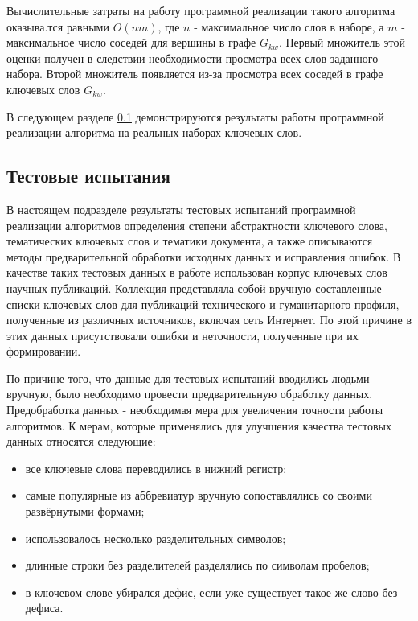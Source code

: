 Вычислительные затраты на работу программной реализации такого алгоритма оказыва.тся равными $O(nm)$, где $n$ - максимальное число слов в наборе, а $m$ - максимальное число соседей для вершины в графе $G_{kw}$. Первый множитель этой оценки получен в следствии необходимости просмотра всех слов заданного набора. Второй множитель появляется из-за просмотра всех соседей в графе ключевых слов $G_{kw}$.

В следующем разделе \ref{theme_test} демонстрируются результаты работы программной реализации алгоритма на реальных наборах ключевых слов.

\subsection{Тестовые испытания} \label{theme_test}

В настоящем подразделе результаты тестовых испытаний программной реализации алгоритмов определения степени абстрактности ключевого слова, тематических ключевых слов  и тематики документа, а также описываются методы предварительной обработки исходных данных и исправления ошибок.  В качестве таких тестовых данных в работе использован корпус ключевых слов научных публикаций. Коллекция представляла собой вручную составленные списки ключевых слов для публикаций технического и гуманитарного профиля, полученные из различных источников, включая сеть Интернет. По этой причине в этих данных присутствовали ошибки и неточности, полученные при их формировании.

По причине того, что данные для тестовых испытаний вводились людьми вручную, было необходимо провести предварительную обработку данных. Предобработка данных - необходимая мера для увеличения точности работы алгоритмов. К мерам, которые применялись для улучшения качества тестовых данных относятся следующие:

\begin{itemize}
    \item все ключевые слова переводились в нижний регистр;
    \item самые популярные из аббревиатур вручную сопоставлялись со своими развёрнутыми формами;
    \item использовалось несколько разделительных символов;
    \item длинные строки без разделителей разделялись по символам пробелов;
    \item в ключевом слове убирался дефис, если уже существует такое же слово без дефиса.
\end{itemize}

